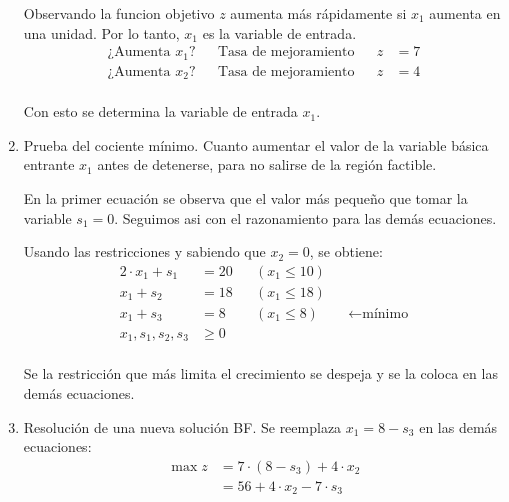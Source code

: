 \documentclass[../main.tex]{subfiles}
\begin{document}
\begin{example}
\begin{enumerate}
                    Observando la funcion objetivo $z$ aumenta más rápidamente si $x_1$ aumenta en una unidad. Por lo tanto, $x_1$ es la variable de entrada.
                    \begin{equation}
                        \begin{aligned}
                            \text{¿Aumenta $x_1$?} && \text{Tasa de mejoramiento} && z &= 7 \\
                            \text{¿Aumenta $x_2$?} && \text{Tasa de mejoramiento} && z &= 4 \\
                        \end{aligned}
                    \end{equation}

                    Con esto se determina la variable de entrada $x_1$.

                \item Prueba del cociente mínimo.
                    Cuanto aumentar el valor de la variable básica entrante $x_1$ antes de detenerse, para no salirse de la región factible.

                    En la primer ecuación se observa que el valor más pequeño que tomar la variable $s_1 = 0$. Seguimos asi con el razonamiento para las demás ecuaciones.

                    Usando las restricciones y sabiendo que $x_2 = 0$, se obtiene:
                    \begin{equation}
                        \begin{aligned}
                            2 \cdot x_1 + s_1 &= 20 && (x_1 \leq 10)\\
                            x_1 + s_2 &= 18 && (x_1 \leq 18)\\
                            x_1 + s_3 &= 8 && (x_1 \leq 8) && \leftarrow \text{mínimo}\\
                            x_1, s_1, s_2, s_3 &\geq 0 \\
                        \end{aligned}
                    \end{equation}

                    Se la restricción que más limita el crecimiento se despeja y se la coloca en las demás ecuaciones.
                \item Resolución de una nueva solución BF.
                    Se reemplaza $x_1 = 8 - s_3$ en las demás ecuaciones:
                    \begin{equation}
                        \begin{split}
                            \max z &= 7 \cdot (8 - s_3) + 4 \cdot x_2 \\
                                   &= 56 + 4 \cdot x_2 - 7 \cdot s_3 \\
                        \end{split}
                    \end{equation}


\end{enumerate}
\end{example}
\end{document}
